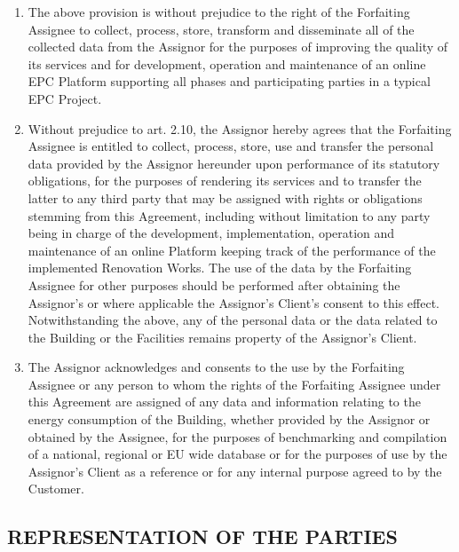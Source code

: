 \documentclass[a4paper]{article}
\begin{document}
\begin{multicols}{2}
\begin{enumerate}
  \item{The above provision is without prejudice to the right of the
      Forfaiting Assignee to collect, process, store, transform and
      disseminate all of the collected data from the Assignor for the
      purposes of improving the quality of its services and for
      development, operation and maintenance of an online EPC Platform
      supporting all phases and participating parties in a typical EPC
      Project.}

  \item{Without prejudice to art. 2.10, the Assignor hereby agrees
      that the Forfaiting Assignee is entitled to collect, process,
      store, use and transfer the personal data provided by the
      Assignor hereunder upon performance of its statutory
      obligations, for the purposes of rendering its services and to
      transfer the latter to any third party that may be assigned with
      rights or obligations stemming from this Agreement, including
      without limitation to any party being in charge of the
      development, implementation, operation and maintenance of an
      online Platform keeping track of the performance of the
      implemented Renovation Works. The use of the data by the
      Forfaiting Assignee for other purposes should be performed after
      obtaining the Assignor’s or where applicable the Assignor's
      Client’s consent to this effect. Notwithstanding the above, any
      of the personal data or the data related to the Building or the
      Facilities remains property of the Assignor's Client.}

  \item{The Assignor acknowledges and consents to the use by the
      Forfaiting Assignee or any person to whom the rights of the
      Forfaiting Assignee under this Agreement are assigned of any
      data and information relating to the energy consumption of the
      Building, whether provided by the Assignor or obtained by the
      Assignee, for the purposes of benchmarking and compilation of a
      national, regional or EU wide database or for the purposes of
      use by the Assignor's Client as a reference or for any internal
      purpose agreed to by the Customer.}
  \end{enumerate}

  \subsection{REPRESENTATION OF THE PARTIES}


\end{multicols}
\end{document}
